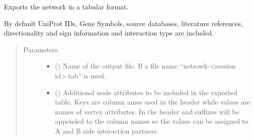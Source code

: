 \documentclass[letterpaper,10pt,english]{sphinxmanual}
\begin{document}
\begin{fulllineitems}

\begin{fulllineitems}
\label{\detokenize{main:pypath.main.PyPath.export_ptms_tab}}
\end{fulllineitems}


\begin{fulllineitems}
\label{\detokenize{main:pypath.main.PyPath.export_sif}}
\end{fulllineitems}


\begin{fulllineitems}
\label{\detokenize{main:pypath.main.PyPath.export_struct_tab}}
\end{fulllineitems}


\begin{fulllineitems}
\label{\detokenize{main:pypath.main.PyPath.export_tab}}
Exports the network in a tabular format.

By default UniProt IDs, Gene Symbols, source databases, literature
references, directionality and sign information and interaction type
are included.
\begin{quote}\begin{description}
\item[{Parameters}] \leavevmode\begin{itemize}
\item {} 
 () \textendash{} Name of the output file. If  a file name
“netrowk-\textless{}session id\textgreater{}.tab” is used.

\item {} 
 () \textendash{} Additional node attributes to be included in the exported table.
Keys are column ames used in the header while values are names
of vertex attributes. In the header  and  suffixes will
be appended to the column names so the values can be assigned to
A and B side interaction partners.


\end{itemize}
\end{description}
\end{quote}
\end{fulllineitems}
\end{fulllineitems}
\end{document}
